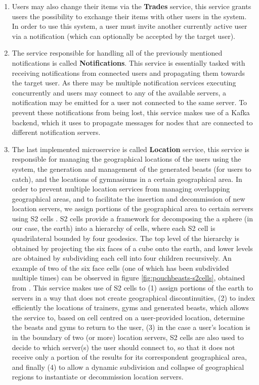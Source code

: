 \begin{enumerate}
    \item Users may also change their items via the \textbf{Trades} service, this service grants users the possibility to exchange their items with other users in the system. In order to use this system, a user must invite another currently active user via a notification (which can optionally be accepted by the target user).

    \item The service responsible for handling all of the previously mentioned notifications is called \textbf{Notifications}. This service is essentially tasked with receiving notifications from connected users and propagating them towards the target user. As there may be multiple notification services executing concurrently and users may connect to any of the available servers, a notification may be emitted for a user not connected to the same server. To prevent these notifications from being lost, this service makes use of a Kafka backend, which it uses to propagate messages for nodes that are connected to different notification servers.

    \item The last implemented microservice is called \textbf{Location} service, this service is responsible for managing the geographical locations of the users using the system, the generation and management of the generated beasts (for users to catch), and the locations of gymnasiums in a certain geographical area. In order to prevent multiple location services from managing overlapping geographical areas, and to facilitate the insertion and decommission of new location servers, we assign portions of the geographical area to certain servers using S2 cells . S2 cells provide a framework for decomposing the a sphere (in our case, the earth) into a hierarchy of cells, where each S2 cell is quadrilateral bounded by four geodesics. The top level of the hierarchy is obtained by projecting the six faces of a cube onto the earth, and lower levels are obtained by subdividing each cell into four children recursively. An example of two of the six face cells (one of which has been subdivided multiple times) can be observed in figure \ref{fig:pouchbeasts-s2cells}, obtained from . This service makes use of S2 cells to (1) assign portions of the earth to servers in a way that does not create geographical discontinuities, (2) to index efficiently the locations of trainers, gyms and generated beasts, which allows the service to, based on cell centred on a user-provided location, determine the beasts and gyms to return to the user, (3) in the case a user's location is in the boundary of two (or more) location servers, S2 cells are also used to decide to which server(s) the user should connect to, so that it does not receive only a portion of the results for its correspondent geographical area, and finally (4) to allow a dynamic subdivision and collapse of geographical regions to instantiate or decommission location servers.

\end{enumerate}

